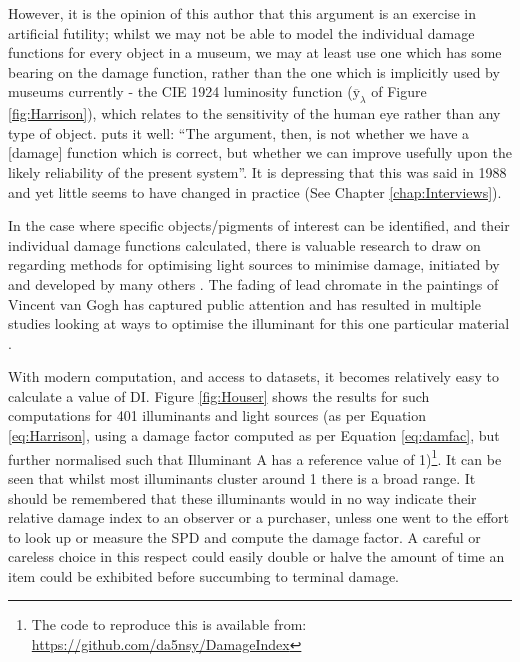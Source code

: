 However, it is the opinion of this author that this argument is an exercise in artificial futility; whilst we may not be able to model the individual damage functions for every object in a museum, we may at least use one which has some bearing on the damage function, rather than the one which is implicitly used by museums currently - the \gls{CIE} 1924 luminosity function ($\overline{\mathrm{y}}_{\lambda}$ of Figure \ref{fig:Harrison}), which relates to the sensitivity of the human eye rather than any type of object. \citet{cuttle_lighting_1988} puts it well: ``The argument, then, is not whether we have a [damage] function which is correct, but whether we can improve usefully upon the likely reliability of the present system''. It is depressing that this was said in 1988 and yet little seems to have changed in practice (See Chapter \ref{chap:Interviews}).

In the case where specific objects/pigments of interest can be identified, and their individual damage functions calculated, there is valuable research to draw on regarding methods for optimising light sources to minimise damage, initiated by \citet{miller_evaluating_1993} and developed by many others \citep{durmus_optimising_2017,durmus_colour_2015,durmus_optimising_2015,durmus_object_2017,delgado_ramos_art_2009,delgado_lighting_2011,luna_selective_2015,cuttle_proposal_2000,vazquez_point_2017}. The fading of lead chromate in the paintings of Vincent van Gogh has captured public attention \citep{lewis_smith_will_2013} and has resulted in multiple studies looking at ways to optimise the illuminant for this one particular material \citep{lunz_can_2017,monico_degradation_2011}.

With modern computation, and access to datasets, it becomes relatively easy to calculate a value of \Gls{DI}. Figure \ref{fig:Houser} shows the results for such computations for 401 illuminants and light sources (as per Equation \ref{eq:Harrison}, using a damage factor computed as per Equation \ref{eq:damfac}, but further normalised such that Illuminant A has a reference value of 1)\footnote{The code to reproduce this is available from: \url{https://github.com/da5nsy/DamageIndex}}. It can be seen that whilst most illuminants cluster around 1 there is a broad range. It should be remembered that these illuminants would in no way indicate their relative damage index to an observer or a purchaser, unless one went to the effort to look up or measure the \gls{SPD} and compute the damage factor. A careful or careless choice in this respect could easily double or halve the amount of time an item could be exhibited before succumbing to terminal damage.

